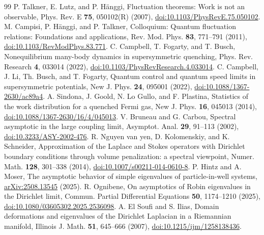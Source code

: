 \documentclass[aps,pra,reprint,superscriptaddress,longbibliography]{revtex4-2}
\begin{document}

\begin{thebibliography}{99}
 P. Talkner, E. Lutz, and P. H\"anggi, Fluctuation theorems: Work is not an observable, Phys. Rev. E \textbf{75}, 050102(R) (2007), \href{https://doi.org/10.1103/PhysRevE.75.050102}{doi:10.1103/PhysRevE.75.050102}.
 M. Campisi, P. H\"anggi, and P. Talkner, Colloquium: Quantum fluctuation relations: Foundations and applications, Rev. Mod. Phys. \textbf{83}, 771--791 (2011), \href{https://doi.org/10.1103/RevModPhys.83.771}{doi:10.1103/RevModPhys.83.771}.
 C. Campbell, T. Fogarty, and T. Busch, Nonequilibrium many-body dynamics in supersymmetric quenching, Phys. Rev. Research \textbf{4}, 033014 (2022), \href{https://doi.org/10.1103/PhysRevResearch.4.033014}{doi:10.1103/PhysRevResearch.4.033014}.
 C. Campbell, J. Li, Th. Busch, and T. Fogarty, Quantum control and quantum speed limits in supersymmetric potentials, New J. Phys. \textbf{24}, 095001 (2022), \href{https://doi.org/10.1088/1367-2630/ac89a4}{doi:10.1088/1367-2630/ac89a4}.
 A. Sindona, J. Goold, N. Lo Gullo, and F. Plastina, Statistics of the work distribution for a quenched Fermi gas, New J. Phys. \textbf{16}, 045013 (2014), \href{https://doi.org/10.1088/1367-2630/16/4/045013}{doi:10.1088/1367-2630/16/4/045013}.
 V. Bruneau and G. Carbou, Spectral asymptotic in the large coupling limit, Asymptot. Anal. \textbf{29}, 91--113 (2002), \href{https://doi.org/10.3233/ASY-2002-476}{doi:10.3233/ASY-2002-476}.
 R. Nguyen van yen, D. Kolomenskiy, and K. Schneider, Approximation of the Laplace and Stokes operators with Dirichlet boundary conditions through volume penalization: a spectral viewpoint, Numer. Math. \textbf{128}, 301--338 (2014), \href{https://doi.org/10.1007/s00211-014-0610-8}{doi:10.1007/s00211-014-0610-8}.
 P. Hintz and A. Moser, The asymptotic behavior of simple eigenvalues of particle-in-well systems, \href{https://arxiv.org/abs/2508.13545}{arXiv:2508.13545} (2025).
 R. Ognibene, On asymptotics of Robin eigenvalues in the Dirichlet limit, Commun. Partial Differential Equations \textbf{50}, 1174--1210 (2025), \href{https://doi.org/10.1080/03605302.2025.2536098}{doi:10.1080/03605302.2025.2536098}.
 A. El Soufi and S. Ilias, Domain deformations and eigenvalues of the Dirichlet Laplacian in a Riemannian manifold, Illinois J. Math. \textbf{51}, 645--666 (2007), \href{https://doi.org/10.1215/ijm/1258138436}{doi:10.1215/ijm/1258138436}.

\end{thebibliography}
\end{document}
